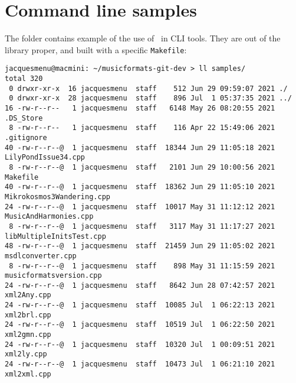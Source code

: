 



\chapter{Command line samples}

The  folder contains example of the use of \mf\ in CLI tools. They are out of the library proper, and built with a specific {\tt Makefile}:
\begin{lstlisting}[language=Terminal]
jacquesmenu@macmini: ~/musicformats-git-dev > ll samples/
total 320
 0 drwxr-xr-x  16 jacquesmenu  staff    512 Jun 29 09:59:07 2021 ./
 0 drwxr-xr-x  28 jacquesmenu  staff    896 Jul  1 05:37:35 2021 ../
16 -rw-r--r--   1 jacquesmenu  staff   6148 May 26 08:20:55 2021 .DS_Store
 8 -rw-r--r--   1 jacquesmenu  staff    116 Apr 22 15:49:06 2021 .gitignore
40 -rw-r--r--@  1 jacquesmenu  staff  18344 Jun 29 11:05:18 2021 LilyPondIssue34.cpp
 8 -rw-r--r--@  1 jacquesmenu  staff   2101 Jun 29 10:00:56 2021 Makefile
40 -rw-r--r--@  1 jacquesmenu  staff  18362 Jun 29 11:05:10 2021 Mikrokosmos3Wandering.cpp
24 -rw-r--r--@  1 jacquesmenu  staff  10017 May 31 11:12:12 2021 MusicAndHarmonies.cpp
 8 -rw-r--r--@  1 jacquesmenu  staff   3117 May 31 11:17:27 2021 libMultipleInitsTest.cpp
48 -rw-r--r--@  1 jacquesmenu  staff  21459 Jun 29 11:05:02 2021 msdlconverter.cpp
 8 -rw-r--r--@  1 jacquesmenu  staff    898 May 31 11:15:59 2021 musicformatsversion.cpp
24 -rw-r--r--@  1 jacquesmenu  staff   8642 Jun 28 07:42:57 2021 xml2Any.cpp
24 -rw-r--r--@  1 jacquesmenu  staff  10085 Jul  1 06:22:13 2021 xml2brl.cpp
24 -rw-r--r--@  1 jacquesmenu  staff  10519 Jul  1 06:22:50 2021 xml2gmn.cpp
24 -rw-r--r--@  1 jacquesmenu  staff  10320 Jul  1 00:09:51 2021 xml2ly.cpp
24 -rw-r--r--@  1 jacquesmenu  staff  10473 Jul  1 06:21:10 2021 xml2xml.cpp
\end{lstlisting}

